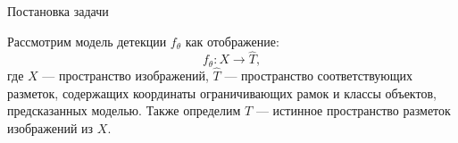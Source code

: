 \documentclass{beamer}
\begin{document}
\begin{frame}{Постановка задачи}




Рассмотрим модель детекции  $f_{\theta}$ как отображение:
\[
f_{\theta}: X \to \hat{T},
\]
где $X$ — пространство изображений, $\hat{T}$ — пространство соответствующих разметок, содержащих координаты ограничивающих рамок и классы объектов, предсказанных моделью. Также определим $T$ — истинное пространство разметок изображений из $X$.


\end{frame}
\end{document}
